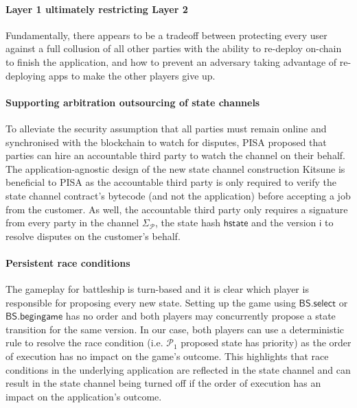 \documentclass{llncs}
\newcommand{\hstate}{\mathsf{hstate}}
\newcommand{\monotoniccounter}{\mathsf{i}}
\newcommand{\participant}{\mathcal{P}}
\newcommand{\battleshipbegin}{\mathsf{BS.begingame}}
\newcommand{\battleshipselectboard}{\mathsf{BS.select}}
\begin{document}
	\paragraph{Layer 1 ultimately restricting Layer 2} 
	Fundamentally, there appears to be a tradeoff between protecting every user against a full collusion of all other parties with the ability to re-deploy on-chain to finish the application, and how to prevent an adversary taking advantage of re-deploying apps to make the other players give up. 
	
	
	\paragraph{Supporting arbitration outsourcing of state channels} 
	To alleviate the security assumption that all parties must remain online and synchronised with the blockchain to watch for disputes, PISA \cite{mccorry2018pisa} proposed that parties can hire an accountable third party to watch the channel on their behalf. 
	The application-agnostic design of the new state channel construction \textsf{Kitsune} is beneficial to PISA as the accountable third party is only required to verify the state channel contract's bytecode (and not the application) before accepting a job from the customer. 
	As well,  the accountable third party only requires a signature from every party in the channel $\Sigma_{\participant}$, the state hash $\hstate$ and the version $\monotoniccounter$ to resolve disputes on the customer's behalf. 
	
	\paragraph{Persistent race conditions} 
	The gameplay for battleship is turn-based and it is clear which player is responsible for proposing every new state. 
	Setting up the game using $\battleshipselectboard$ or $\battleshipbegin$ has no order and both players may concurrently propose a state transition for the same version. 
	In our case, both players can use a deterministic rule to resolve the race condition (i.e. $\participant_{1}$ proposed state has priority) as the order of execution has no impact on the game's outcome. 
	This highlights that race conditions in the underlying application are reflected in the state channel and can result in the state channel being turned off if the order of execution has an impact on the application's outcome. 
\end{document}
